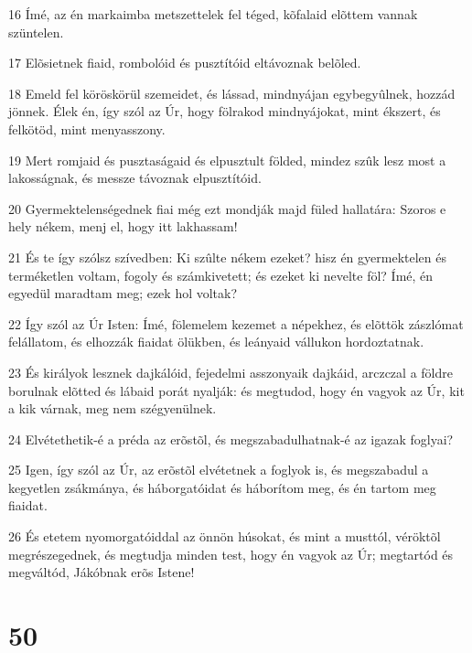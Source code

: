\par 16 Ímé, az én markaimba metszettelek fel téged, kõfalaid elõttem vannak szüntelen.
\par 17 Elõsietnek fiaid, rombolóid és pusztítóid eltávoznak belõled.
\par 18 Emeld fel köröskörül szemeidet, és lássad, mindnyájan egybegyûlnek, hozzád jönnek. Élek én, így szól az Úr, hogy fölrakod mindnyájokat, mint ékszert, és felkötöd, mint menyasszony.
\par 19 Mert romjaid és pusztaságaid és elpusztult földed, mindez szûk lesz most a lakosságnak, és messze távoznak elpusztítóid.
\par 20 Gyermektelenségednek fiai még ezt mondják majd füled hallatára: Szoros e hely nékem, menj el, hogy itt lakhassam!
\par 21 És te így szólsz szívedben: Ki szûlte nékem ezeket? hisz én gyermektelen és terméketlen voltam, fogoly és számkivetett; és ezeket ki nevelte föl? Ímé, én egyedül maradtam meg; ezek hol voltak?
\par 22 Így szól az Úr Isten: Ímé, fölemelem kezemet a népekhez, és elõttök zászlómat felállatom, és elhozzák fiaidat ölükben, és leányaid vállukon hordoztatnak.
\par 23 És királyok lesznek dajkálóid, fejedelmi asszonyaik dajkáid, arczczal a földre borulnak elõtted és lábaid porát nyalják: és megtudod, hogy én vagyok az Úr, kit a kik várnak, meg nem szégyenülnek.
\par 24 Elvétethetik-é a préda az erõstõl, és megszabadulhatnak-é az igazak foglyai?
\par 25 Igen, így szól az Úr, az erõstõl elvétetnek a foglyok is, és megszabadul a kegyetlen zsákmánya, és háborgatóidat és háborítom meg, és én tartom meg fiaidat.
\par 26 És etetem nyomorgatóiddal az önnön húsokat, és mint a musttól, véröktõl megrészegednek, és megtudja minden test, hogy én vagyok  az Úr; megtartód és megváltód, Jákóbnak erõs Istene!

\chapter{50}


